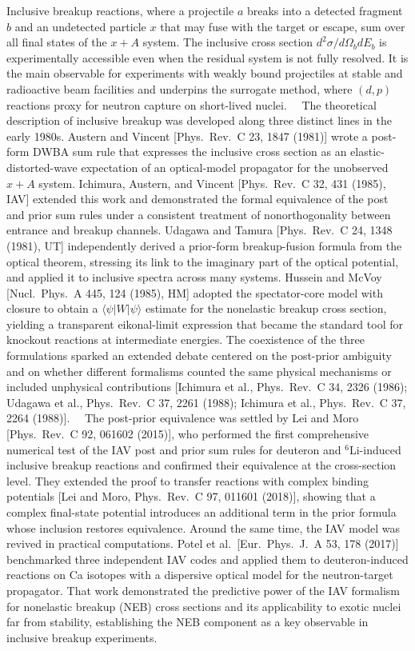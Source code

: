 
Inclusive breakup reactions, where a projectile $a$ breaks into a detected fragment $b$ and an undetected particle $x$ that may fuse with the target or escape, sum over all final states of the $x+A$ system. The inclusive cross section $d^2\sigma/d\Omega_b dE_b$ is experimentally accessible even when the residual system is not fully resolved. It is the main observable for experiments with weakly bound projectiles at stable and radioactive beam facilities and underpins the surrogate method, where $(d,p)$ reactions proxy for neutron capture on short-lived nuclei.
\
\
The theoretical description of inclusive breakup was developed along three distinct lines in the early 1980s. Austern and Vincent [Phys.\ Rev.\ C 23, 1847 (1981)] wrote a post-form DWBA sum rule that expresses the inclusive cross section as an elastic-distorted-wave expectation of an optical-model propagator for the unobserved $x+A$ system. Ichimura, Austern, and Vincent [Phys.\ Rev.\ C 32, 431 (1985), IAV] extended this work and demonstrated the formal equivalence of the post and prior sum rules under a consistent treatment of nonorthogonality between entrance and breakup channels. Udagawa and Tamura [Phys.\ Rev.\ C 24, 1348 (1981), UT] independently derived a prior-form breakup-fusion formula from the optical theorem, stressing its link to the imaginary part of the optical potential, and applied it to inclusive spectra across many systems. Hussein and McVoy [Nucl.\ Phys.\ A 445, 124 (1985), HM] adopted the spectator-core model with closure to obtain a $\langle \psi | W | \psi \rangle$ estimate for the nonelastic breakup cross section, yielding a transparent eikonal-limit expression that became the standard tool for knockout reactions at intermediate energies. The coexistence of the three formulations sparked an extended debate centered on the post-prior ambiguity and on whether different formalisms counted the same physical mechanisms or included unphysical contributions [Ichimura et al., Phys.\ Rev.\ C 34, 2326 (1986); Udagawa et al., Phys.\ Rev.\ C 37, 2261 (1988); Ichimura et al., Phys.\ Rev.\ C 37, 2264 (1988)].
\
\
The post-prior equivalence was settled by Lei and Moro [Phys.\ Rev.\ C 92, 061602 (2015)], who performed the first comprehensive numerical test of the IAV post and prior sum rules for deuteron and $^6$Li-induced inclusive breakup reactions and confirmed their equivalence at the cross-section level. They extended the proof to transfer reactions with complex binding potentials [Lei and Moro, Phys.\ Rev.\ C 97, 011601 (2018)], showing that a complex final-state potential introduces an additional term in the prior formula whose inclusion restores equivalence. Around the same time, the IAV model was revived in practical computations. Potel et al.\ [Eur.\ Phys.\ J.\ A 53, 178 (2017)] benchmarked three independent IAV codes and applied them to deuteron-induced reactions on Ca isotopes with a dispersive optical model for the neutron-target propagator. That work demonstrated the predictive power of the IAV formalism for nonelastic breakup (NEB) cross sections and its applicability to exotic nuclei far from stability, establishing the NEB component as a key observable in inclusive breakup experiments.
